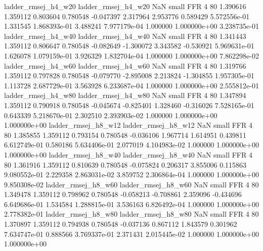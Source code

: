      ladder_rmsej_h4_w20      ladder_rmsej_h4_w20                   NaN      small      FFR                 4 80 1.390616       1.359112 0.803604       0.780548   -0.047397      2.317964      2.953776     0.589429   5.572556e-01  1.331545 1.868393e-01     3.488241   7.977179e-04            1.000000    1.000000e+00        3.238735e-01
     ladder_rmsej_h4_w40      ladder_rmsej_h4_w40                   NaN      small      FFR                 4 80 1.341443       1.359112 0.806647       0.780548   -0.082649     -1.300072      3.343582    -0.530921   5.969631e-01  1.626078 1.079159e-01     3.926329   1.832704e-04            1.000000    1.000000e+00        7.862298e-02
     ladder_rmsej_h4_w60      ladder_rmsej_h4_w60                   NaN      small      FFR                 4 80 1.319766       1.359112 0.797828       0.780548   -0.079770     -2.895008      2.213824    -1.304855   1.957305e-01  1.113728 2.687729e-01     3.563928   6.233687e-04            1.000000    1.000000e+00        2.555812e-01
     ladder_rmsej_h4_w80      ladder_rmsej_h4_w80                   NaN      small      FFR                 4 80 1.347894       1.359112 0.790918       0.780548   -0.045674     -0.825401      1.328460    -0.316026   7.528165e-01  0.643339 5.218670e-01     2.302510   2.393903e-02            1.000000    1.000000e+00        1.000000e+00
     ladder_rmsej_h8_w12      ladder_rmsej_h8_w12                   NaN      small      FFR                 4 80 1.385855       1.359112 0.793154       0.780548   -0.036106      1.967714      1.614951     0.439811   6.612749e-01  0.580186 5.634406e-01     2.077019   4.104983e-02            1.000000    1.000000e+00        1.000000e+00
     ladder_rmsej_h8_w40      ladder_rmsej_h8_w40                   NaN      small      FFR                 4 80 1.361916       1.359112 0.810639       0.780548   -0.075824      0.206317      3.855006     0.115863   9.080552e-01  2.229358 2.863031e-02     3.859752   2.306864e-04            1.000000    1.000000e+00        9.850308e-02
     ladder_rmsej_h8_w60      ladder_rmsej_h8_w60                   NaN      small      FFR                 4 80 1.349478       1.359112 0.798962       0.780548   -0.058213     -0.708861      2.359096    -0.434696   6.649686e-01  1.534584 1.288815e-01     3.536163   6.826492e-04            1.000000    1.000000e+00        2.778382e-01
     ladder_rmsej_h8_w80      ladder_rmsej_h8_w80                   NaN      small      FFR                 4 80 1.370897       1.359112 0.794938       0.780548   -0.037136      0.867112      1.843579     0.301962   7.634747e-01  0.888566 3.769337e-01     2.371431   2.015445e-02            1.000000    1.000000e+00        1.000000e+00
